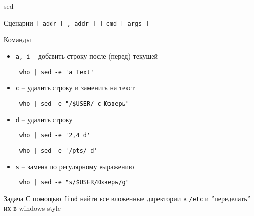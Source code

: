 \begin{frame}[fragile]{sed}
	\begin{block}{Сценарии}
		{\tt [ addr [ ,  addr ] ] cmd [ args ]}
	\end{block}

	\tiny
	\begin{block}{Команды}
		\begin{itemize}
		  \item {\tt a, i} -- добавить строку после (перед) текущей
			  \begin{verbatim} who | sed -e 'a Text' \end{verbatim}
		  \item {\tt c} -- удалить строку и заменить на текст
			  \begin{verbatim} who | sed -e "/$USER/ c Юзверь" \end{verbatim}
		  \item {\tt d} -- удалить строку
			  \begin{verbatim} who | sed -e '2,4 d' \end{verbatim}
			  \begin{verbatim} who | sed -e '/pts/ d' \end{verbatim}
		  \item {\tt s} -- замена по регулярному выражению
			  \begin{verbatim} who | sed -e "s/$USER/Юзверь/g" \end{verbatim}
		\end{itemize}
	\end{block}
	\pause
	\begin{block}{Задача}
		С помощью {\tt find} найти все вложенные директории в {\tt /etc} и 
		''переделать'' их в windows-style
	\end{block}
\end{frame}


